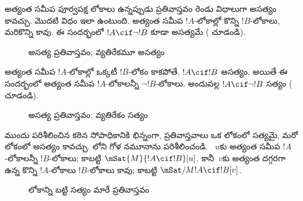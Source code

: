 \documentclass[../../../include/open-logic-section]{subfiles}
\begin{document}
అత్యంత సమీప పూర్వపక్ష లోకాలు ఉన్నప్పుడు ప్రతివాస్తవం
రెండు విధాలుగా అసత్యం కావచ్చు. మొదటి విధం ఇలా ఉంటుంది.
అత్యంత సమీప $!A$-లోకాల్లో కొన్ని $!B$-లోకాలు,
మరికొన్ని కావు.
ఈ సందర్భంలో $!A \cif
\lnot !B$ కూడా అసత్యమే
( చూడండి).
\begin{figure}
\begin{center}
\caption{అసత్య ప్రతివాస్తవం; వ్యతిరేకమూ అసత్యం}
\end{center}
\end{figure}
అత్యంత సమీప $!A$-లోకాల్లో ఒక్కటీ $!B$-లోకం కాకపోతే, $!A \cif !B$
అసత్యం. అయితే ఈ సందర్భంలో
అత్యంత సమీప $!A$-లోకాలన్నీ
$\lnot !B$-లోకాలు. అందువల్ల
$!A \cif \lnot !B$ సత్యం
( చూడండి).
\begin{figure}
\begin{center}
\caption{అసత్య ప్రతివాస్తవం; వ్యతిరేకం సత్యం}
\end{center}
\end{figure}

ముందు పరిశీలించిన 
కఠిన సోపాధికానికి భిన్నంగా,
ప్రతివాస్తవాలు ఒక లోకంలో సత్యమై, మరో లోకంలో అసత్యం కావచ్చు.
లోని
గోళ నమూనాను పరిశీలించండి.
~$u$కు అత్యంత సమీప
$!A$-లోకాలన్నీ $!B$-లోకాలు;
కాబట్టి $\mSat{M}{!A \cif
  !B}[u]$. కానీ~$v$కు
అత్యంత దగ్గరగా ఉన్న కొన్ని
$!A$-లోకాలు $!B$-లోకాలు
కావు; కాబట్టి
$\mSat/{M}{!A \cif !B}[v]$.
\begin{figure}
\begin{center}
\end{center}
\caption{లోకాన్ని బట్టి సత్యం మారే ప్రతివాస్తవం}
\end{figure}
\end{document}
